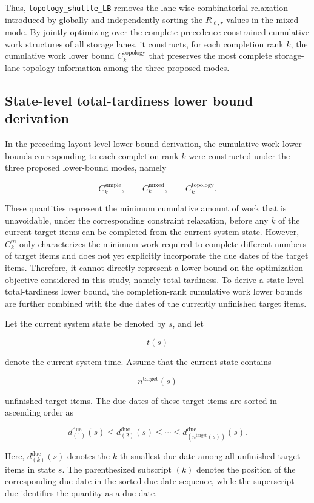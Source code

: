 Thus, \texttt{topology\_shuttle\_LB} removes the lane-wise combinatorial
relaxation introduced by globally and independently sorting the
\(R_{\ell,r}\) values in the mixed mode. By jointly optimizing over the complete
precedence-constrained cumulative work structures of all storage lanes, it
constructs, for each completion rank \(k\), the cumulative work lower bound
\(C_k^{\mathrm{topology}}\) that preserves the most complete storage-lane
topology information among the three proposed modes.

\subsection{State-level total-tardiness lower bound derivation}

In the preceding layout-level lower-bound derivation, the cumulative work lower
bounds corresponding to each completion rank \(k\) were constructed under the
three proposed lower-bound modes, namely

\[
C_k^{\mathrm{simple}},
\qquad
C_k^{\mathrm{mixed}},
\qquad
C_k^{\mathrm{topology}}.
\]

These quantities represent the minimum cumulative amount of work that is
unavoidable, under the corresponding constraint relaxation, before any \(k\)
of the current target items can be completed from the current system state.
However, \(C_k^m\) only characterizes the minimum work required to complete
different numbers of target items and does not yet explicitly incorporate the
due dates of the target items. Therefore, it cannot directly represent a lower
bound on the optimization objective considered in this study, namely total
tardiness. To derive a state-level total-tardiness lower bound, the
completion-rank cumulative work lower bounds are further combined with the due
dates of the currently unfinished target items.

Let the current system state be denoted by \(s\), and let

\[
t(s)
\]

denote the current system time. Assume that the current state contains

\[
n^{\mathrm{target}}(s)
\]

unfinished target items. The due dates of these target items are sorted in
ascending order as

\[
d_{(1)}^{\mathrm{due}}(s)
\leq
d_{(2)}^{\mathrm{due}}(s)
\leq
\cdots
\leq
d_{\left(n^{\mathrm{target}}(s)\right)}^{\mathrm{due}}(s).
\]

Here, \(d_{(k)}^{\mathrm{due}}(s)\) denotes the \(k\)-th smallest due date
among all unfinished target items in state \(s\). The parenthesized subscript
\((k)\) denotes the position of the corresponding due date in the sorted
due-date sequence, while the superscript \(\mathrm{due}\) identifies the
quantity as a due date.

